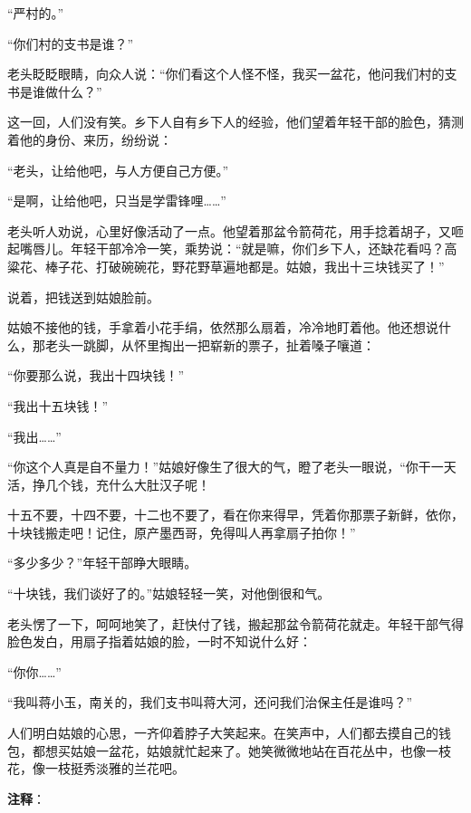 \documentclass[12pt,UTF-8,openany]{ctexbook}
\begin{document}
\begin{normalsize}
    “严村的。”
    
    “你们村的支书是谁？”
    
    老头眨眨眼睛，向众人说：“你们看这个人怪不怪，我买一盆花，他问我们村的支书是谁做什么？”
    
    这一回，人们没有笑。乡下人自有乡下人的经验，他们望着年轻干部的脸色，猜测着他的身份、来历，纷纷说：
    
    “老头，让给他吧，与人方便自己方便。”
    
    “是啊，让给他吧，只当是学雷锋哩……”
    
    老头听人劝说，心里好像活动了一点。他望着那盆令箭荷花，用手捻着胡子，又咂起嘴唇儿。年轻干部冷冷一笑，乘势说：“就是嘛，你们乡下人，还缺花看吗？高粱花、棒子花、打破碗碗花，野花野草遍地都是。姑娘，我出十三块钱买了！”
    
    说着，把钱送到姑娘脸前。
    
    姑娘不接他的钱，手拿着小花手绢，依然那么扇着，冷冷地盯着他。他还想说什么，那老头一跳脚，从怀里掏出一把崭新的票子，扯着嗓子嚷道：
    
    “你要那么说，我出十四块钱！”
    
    “我出十五块钱！”
    
    “我出……”
    
    “你这个人真是自不量力！”姑娘好像生了很大的气，瞪了老头一眼说，“你干一天活，挣几个钱，充什么大肚汉子呢！
    
    十五不要，十四不要，十二也不要了，看在你来得早，凭着你那票子新鲜，依你，十块钱搬走吧！记住，原产墨西哥，免得叫人再拿扇子拍你！”
    
    “多少多少？”年轻干部睁大眼睛。
    
    “十块钱，我们谈好了的。”姑娘轻轻一笑，对他倒很和气。
    
    老头愣了一下，呵呵地笑了，赶快付了钱，搬起那盆令箭荷花就走。年轻干部气得脸色发白，用扇子指着姑娘的脸，一时不知说什么好：
    
    “你你……”
    
    “我叫蒋小玉，南关的，我们支书叫蒋大河，还问我们治保主任是谁吗？”
    
    人们明白姑娘的心思，一齐仰着脖子大笑起来。在笑声中，人们都去摸自己的钱包，都想买姑娘一盆花，姑娘就忙起来了。她笑微微地站在百花丛中，也像一枝花，像一枝挺秀淡雅的兰花吧。
    
\end{normalsize}


\newpage

\textbf{注释}：

\vspace{-1em}
\end{document}
